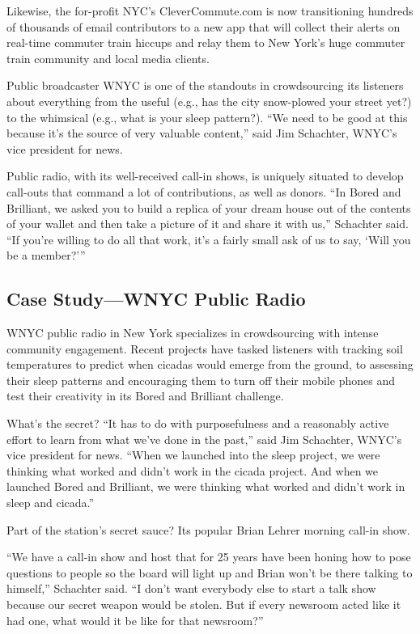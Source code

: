 \begin{itemize}
Likewise, the for-profit NYC’s CleverCommute.com is now transitioning hundreds of thousands of email contributors to a new app that will collect their alerts on real-time commuter train hiccups and relay them to New York’s huge commuter train community and local media clients.\autocite{Commute}

Public broadcaster WNYC is one of the standouts in crowdsourcing its listeners about everything from the useful (e.g., has the city snow-plowed your street yet?) to the whimsical (e.g., what is your sleep pattern?).
``We need to be good at this because it’s the source of very valuable content,'' said Jim Schachter, WNYC’s vice president for news.\autocite{Schachter}

Public radio, with its well-received call-in shows, is uniquely situated to develop call-outs that command a lot of contributions, as well as donors. ``In Bored and Brilliant, we asked you to build a replica of your dream house out of the contents of your wallet and then take a picture of it and share it with us,'' Schachter said. ``If you’re willing to do all that work, it’s a fairly small ask of us to say, ‘Will you be a member?’''


\subsection{Case Study---WNYC Public Radio}

WNYC public radio in New York specializes in crowdsourcing with intense community engagement. Recent projects have tasked listeners with tracking soil temperatures to predict when cicadas would emerge from the ground, to assessing their sleep patterns and encouraging them to turn off their mobile phones and test their creativity in its Bored and Brilliant challenge.

What’s the secret? ``It has to do with purposefulness and a reasonably active effort to learn from what we’ve done in the past,'' said Jim Schachter, WNYC’s vice president for news. ``When we launched into the sleep project, we were thinking what worked and didn’t work in the cicada project. And when we launched Bored and Brilliant, we were thinking what worked and didn’t work in sleep and cicada.''

Part of the station’s secret sauce? Its popular Brian Lehrer morning call-in show. 

``We have a call-in show and host that for 25 years have been honing how to pose questions to people so the board will light up and Brian won’t be there talking to himself,'' Schachter said. ``I don’t want everybody else to start a talk show because our secret weapon would be stolen. But if every newsroom acted like it had one, what would it be like for that newsroom?''


\end{itemize}
